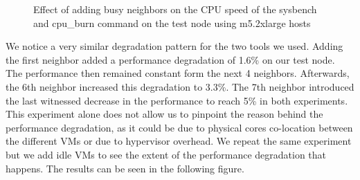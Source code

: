\begin{figure}[H]
\centering
{}
\caption{Effect of adding busy neighbors on the CPU speed of the sysbench and cpu\_burn command on the 
test node using m5.2xlarge hosts}
\label{fig::m5.2xlarge}
\end{figure}
\noindent
We notice a very similar degradation pattern for the two tools we used.
Adding the first neighbor added a performance degradation of  1.6\% on our test node. The performance then 
remained constant form the next 4 neighbors. Afterwards, the 6th neighbor increased this degradation to 
3.3\%. The 7th neighbor introduced the last witnessed decrease in the performance to reach 5\% in both 
experiments. \\ 
This experiment alone does not allow us to pinpoint the reason behind the performance degradation, 
as it could be due to physical cores co-location between the different VMs or due to hypervisor overhead. 
We repeat the same experiment but we add idle VMs to see the extent of the performance degradation that 
happens. The results can be seen in the following figure. 

